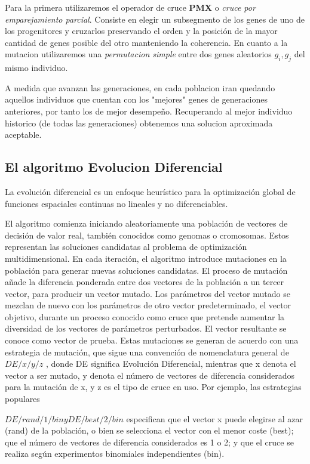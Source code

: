 \documentclass[10pt]{article}
\begin{document}
Para la primera utilizaremos el operador de cruce \textbf{PMX} o \textit{cruce por emparejamiento parcial}. Consiste en elegir un subsegmento de los genes de uno de los progenitores y cruzarlos preservando el orden y la posición de la mayor cantidad de genes posible del otro manteniendo la coherencia.
En cuanto a la mutacion utilizaremos una \textit{permutacion simple} entre dos genes aleatorios $g_i,g_j$ del mismo individuo.

A medida que avanzan las generaciones, en cada poblacion iran quedando aquellos individuos que cuentan con los "mejores"  genes de generaciones anteriores, por tanto los de mejor desempeño. Recuperando al mejor individuo historico (de todas las generaciones) obtenemos una solucion aproximada aceptable.

\subsection{El algoritmo Evolucion Diferencial}

La evolución diferencial es un enfoque heurístico para la optimización global de funciones espaciales continuas no lineales y no diferenciables. 

El algoritmo comienza iniciando aleatoriamente una población de vectores de decisión de valor real, también conocidos como genomas o cromosomas. Estos representan las soluciones candidatas al problema de optimización multidimensional.\newline
En cada iteración, el algoritmo introduce mutaciones en la población para generar nuevas soluciones candidatas. El proceso de mutación añade la diferencia ponderada entre dos vectores de la población a un tercer vector, para producir un vector mutado. Los parámetros del vector mutado se mezclan de nuevo con los parámetros de otro vector predeterminado, el vector objetivo, durante un proceso conocido como cruce que pretende aumentar la diversidad de los vectores de parámetros perturbados. El vector resultante se conoce como vector de prueba.
Estas mutaciones se generan de acuerdo con una estrategia de mutación, que sigue una convención de nomenclatura general de $DE/x/y/z$ , donde DE significa Evolución Diferencial, mientras que x denota el vector a ser mutado, y denota el número de vectores de diferencia considerados para la mutación de x, y z es el tipo de cruce en uso. Por ejemplo, las estrategias populares

$ DE/rand/1/bin y DE/best/2/bin $ especifican que el vector x puede elegirse al azar (rand) de la población, o bien se selecciona el vector con el menor coste (best); que el número de vectores de diferencia considerados es 1 o 2; y que el cruce se realiza según experimentos binomiales independientes (bin).
\end{document}
